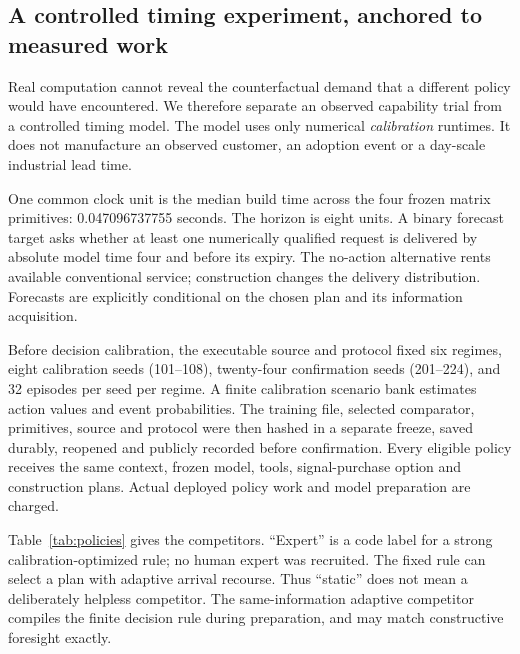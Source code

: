 \subsection{A controlled timing experiment, anchored to measured work}
Real computation cannot reveal the counterfactual demand that a different policy would have encountered. We therefore separate an observed capability trial from a controlled timing model. The model uses only numerical \emph{calibration} runtimes. It does not manufacture an observed customer, an adoption event or a day-scale industrial lead time.

One common clock unit is the median build time across the four frozen matrix primitives: 0.047096737755 seconds. The horizon is eight units. A binary forecast target asks whether at least one numerically qualified request is delivered by absolute model time four and before its expiry. The no-action alternative rents available conventional service; construction changes the delivery distribution. Forecasts are explicitly conditional on the chosen plan and its information acquisition.

Before decision calibration, the executable source and protocol fixed six regimes, eight calibration seeds (101--108), twenty-four confirmation seeds (201--224), and 32 episodes per seed per regime. A finite calibration scenario bank estimates action values and event probabilities. The training file, selected comparator, primitives, source and protocol were then hashed in a separate freeze, saved durably, reopened and publicly recorded before confirmation. Every eligible policy receives the same context, frozen model, tools, signal-purchase option and construction plans. Actual deployed policy work and model preparation are charged.

Table~\ref{tab:policies} gives the competitors. ``Expert'' is a code label for a strong calibration-optimized rule; no human expert was recruited. The fixed rule can select a plan with adaptive arrival recourse. Thus ``static'' does not mean a deliberately helpless competitor. The same-information adaptive competitor compiles the finite decision rule during preparation, and may match constructive foresight exactly.


